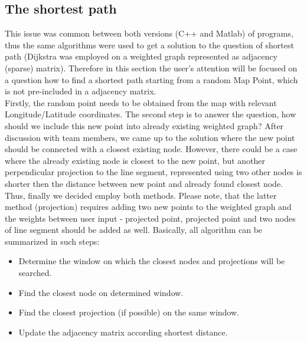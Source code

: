 \documentclass{article}
\begin{document}
\subsection{The shortest path}
This issue was common between both versions (C++ and Matlab) of programs, thus the same algorithms were used to get a solution to the question of shortest path (Dijkstra was employed on a weighted graph represented as adjacency (sparse) matrix). Therefore in this section the user's attention will be focused on a question how to find a shortest path starting from a random Map Point, which is not pre-included in a adjacency matrix.\\
Firstly, the random point needs to be obtained from the map with relevant Longitude/Latitude coordinates. The second step is to answer the question, how should we include this new point into already existing weighted graph? After discussion with team members, we came up to the solution where the new point should be connected with a closest existing node. However, there could be a case where the already existing node is closest to the new point, but another perpendicular projection to the line segment, represented using two other nodes is shorter then the distance between new point and already found closest node. Thus, finally we decided employ both methods. Please note, that the latter method (projection) requires adding two new points to the weighted graph and the weights between user input - projected point, projected point and two nodes of line segment should be added as well.
Basically, all algorithm can be summarized in such steps:
\begin{itemize}
\item Determine the window on which the closest nodes and projections will be searched.
\item Find the closest node on determined window.
\item Find the closest projection (if possible) on the same window.
\item Update the adjacency matrix according shortest distance.
\end{itemize}

 
\end{document}

